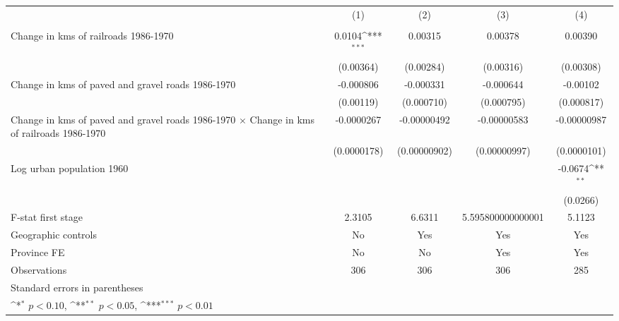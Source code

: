 {
\def\sym#1{\ifmmode^{#1}\else\(^{#1}\)\fi}
\begin{tabular}{l*{4}{c}}
\hline\hline
                &\multicolumn{1}{c}{(1)}&\multicolumn{1}{c}{(2)}&\multicolumn{1}{c}{(3)}&\multicolumn{1}{c}{(4)}\\
                &\multicolumn{1}{c}{}&\multicolumn{1}{c}{}&\multicolumn{1}{c}{}&\multicolumn{1}{c}{}\\
\hline
Change in kms of railroads 1986-1970&   0.0104\sym{***}&  0.00315         &  0.00378         &  0.00390         \\
                &(0.00364)         &(0.00284)         &(0.00316)         &(0.00308)         \\
[1em]
Change in kms of paved and gravel roads 1986-1970&-0.000806         &-0.000331         &-0.000644         & -0.00102         \\
                &(0.00119)         &(0.000710)         &(0.000795)         &(0.000817)         \\
[1em]
Change in kms of paved and gravel roads 1986-1970 $\times$ Change in kms of railroads 1986-1970&-0.0000267         &-0.00000492         &-0.00000583         &-0.00000987         \\
                &(0.0000178)         &(0.00000902)         &(0.00000997)         &(0.0000101)         \\
[1em]
Log urban population 1960&                  &                  &                  &  -0.0674\sym{**} \\
                &                  &                  &                  & (0.0266)         \\
\hline
F-stat first stage&   2.3105         &   6.6311         &5.595800000000001         &   5.1123         \\
Geographic controls&       No         &      Yes         &      Yes         &      Yes         \\
Province FE     &       No         &       No         &      Yes         &      Yes         \\
Observations    &      306         &      306         &      306         &      285         \\
\hline\hline
\multicolumn{5}{l}{\footnotesize Standard errors in parentheses}\\
\multicolumn{5}{l}{\footnotesize \sym{*} \(p<0.10\), \sym{**} \(p<0.05\), \sym{***} \(p<0.01\)}\\
\end{tabular}
}
